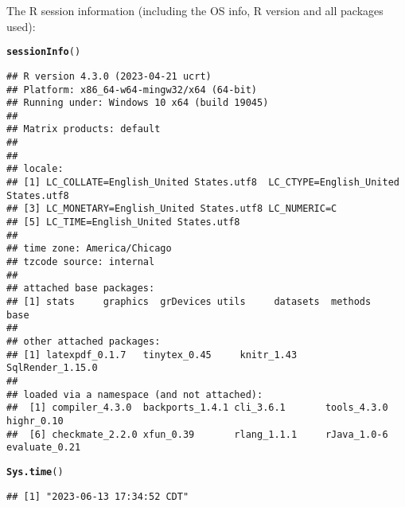 \documentclass{article}\usepackage[]{graphicx}\usepackage[]{xcolor}
\makeatletter
\newcommand{\hlstd}[1]{\textcolor[rgb]{0.345,0.345,0.345}{#1}}%
\newcommand{\hlkwd}[1]{\textcolor[rgb]{0.737,0.353,0.396}{\textbf{#1}}}%
\newenvironment{kframe}{%
 \def\at@end@of@kframe{}%
 \ifinner\ifhmode%
  \def\at@end@of@kframe{\end{minipage}}%
  \begin{minipage}{\columnwidth}%
 \fi\fi%
 \def\FrameCommand##1{\hskip\@totalleftmargin \hskip-\fboxsep
 \colorbox{shadecolor}{##1}\hskip-\fboxsep
     \hskip-\linewidth \hskip-\@totalleftmargin \hskip\columnwidth}%
 \MakeFramed {\advance\hsize-\width
   \@totalleftmargin\z@ \linewidth\hsize
   \@setminipage}}%
 {\par\unskip\endMakeFramed%
 \at@end@of@kframe}
\newenvironment{knitrout}{}{} %
\makeatother
\begin{document}
The R session information (including the OS info, R version and all
packages used):

\begin{knitrout}
\color{fgcolor}\begin{kframe}
\begin{alltt}
\hlkwd{sessionInfo}\hlstd{()}
\end{alltt}
\begin{verbatim}
## R version 4.3.0 (2023-04-21 ucrt)
## Platform: x86_64-w64-mingw32/x64 (64-bit)
## Running under: Windows 10 x64 (build 19045)
## 
## Matrix products: default
## 
## 
## locale:
## [1] LC_COLLATE=English_United States.utf8  LC_CTYPE=English_United States.utf8   
## [3] LC_MONETARY=English_United States.utf8 LC_NUMERIC=C                          
## [5] LC_TIME=English_United States.utf8    
## 
## time zone: America/Chicago
## tzcode source: internal
## 
## attached base packages:
## [1] stats     graphics  grDevices utils     datasets  methods   base     
## 
## other attached packages:
## [1] latexpdf_0.1.7   tinytex_0.45     knitr_1.43       SqlRender_1.15.0
## 
## loaded via a namespace (and not attached):
##  [1] compiler_4.3.0  backports_1.4.1 cli_3.6.1       tools_4.3.0     highr_0.10     
##  [6] checkmate_2.2.0 xfun_0.39       rlang_1.1.1     rJava_1.0-6     evaluate_0.21
\end{verbatim}
\begin{alltt}
\hlkwd{Sys.time}\hlstd{()}
\end{alltt}
\begin{verbatim}
## [1] "2023-06-13 17:34:52 CDT"
\end{verbatim}
\end{kframe}
\end{knitrout}
\end{document}
